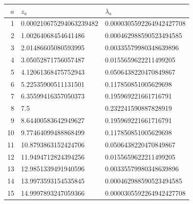 \begin{center}\small
\begin{tabular}{rll}
$a$ & $z_a$ & $\lambda_a$\\\hline
1 & 0.000210675294063239482 & 0.0000305592264942427708\\
2 & 1.00264068454641486 & 0.000462988590523494585\\
3 & 2.01486605080593995 & 0.00335579980348639896\\
4 & 3.05052871756057487 & 0.0155659622211499205\\
5 & 4.12061368475752943 & 0.0506438220470849867\\
6 & 5.22535900511131501 & 0.117850851005629698\\
7 & 6.35599416357050373 & 0.195969221661716791\\
8 & 7.5 & 0.232241590887828919\\
9 & 8.64400583642949627 & 0.195969221661716791\\
10 & 9.77464099488868499 & 0.117850851005629698\\
11 & 10.8793863152424706 & 0.0506438220470849867\\
12 & 11.9494712824394256 & 0.0155659622211499205\\
13 & 12.9851339491940596 & 0.00335579980348639896\\
14 & 13.9973593154535845 & 0.000462988590523494585\\
15 & 14.9997893247059366 & 0.0000305592264942427708\\
\end{tabular}
\end{center}
